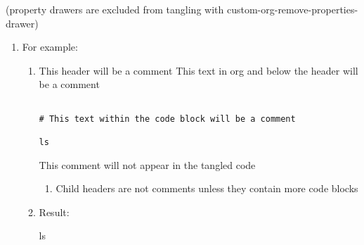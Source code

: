 \documentclass{article}
\begin{document}
(property drawers are excluded from tangling with custom-org-remove-properties-drawer)\\[0pt]
\begin{enumerate}
\item For example:
\label{sec:orge92e50d}
\begin{enumerate}
\item This header will be a comment
\label{sec:org63fdfe2}
This text in org and below the header will be a comment\\[0pt]

\begin{verbatim}

# This text within the code block will be a comment

ls

\end{verbatim}

This comment will not appear in the tangled code\\[0pt]

\begin{enumerate}
\item Child headers are not comments unless they contain more code blocks
\label{sec:org64810d5}
\end{enumerate}
\item Result:
\label{sec:org808e40a}

ls\\[0pt]
\end{enumerate}
\end{enumerate}
\end{document}

